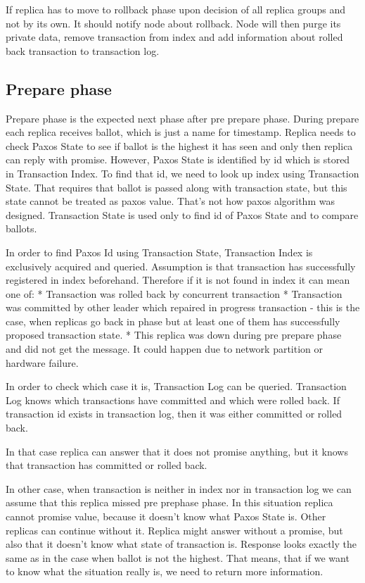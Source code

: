 If replica has to move to rollback phase upon decision of all replica groups and not by its own. It should notify node about rollback. Node will then purge its private data, remove transaction from index and add information about rolled back transaction to transaction log.


\subsection{Prepare phase}
Prepare phase is the expected next phase after pre prepare phase. During prepare each replica receives ballot, which is just a name for timestamp. Replica needs to check Paxos State to see if ballot is the highest it has seen and only then replica can reply with promise. However, Paxos State is identified by id which is stored in Transaction Index. To find that id, we need to look up index using Transaction State. That requires that ballot is passed along with transaction state, but this state cannot be treated as paxos value. That’s not how paxos algorithm was designed. Transaction State is used only to find id of Paxos State and to compare ballots.


In order to find Paxos Id using Transaction State, Transaction Index is exclusively acquired and queried. Assumption is that transaction has successfully registered in index beforehand. Therefore if it is not found in index it can mean one of:
* Transaction was rolled back by concurrent transaction
* Transaction was committed by other leader which repaired in progress transaction - this is the case, when replicas go back in phase but at least one of them has successfully proposed transaction state.
* This replica was down during pre prepare phase and did not get the message. It could happen due to network partition or hardware failure.


In order to check which case it is, Transaction Log can be queried. Transaction Log knows which transactions have committed and which were rolled back. If transaction id exists in transaction log, then it was either committed or rolled back.


In that case replica can answer that it does not promise anything, but it knows that transaction has committed or rolled back.


In other case, when transaction is neither in index nor in transaction log we can assume that this replica missed pre prephase phase. In this situation replica cannot promise value, because it doesn’t know what Paxos State is. Other replicas can continue without it. Replica might answer without a promise, but also that it doesn’t know what state of transaction is. Response looks exactly the same as in the case when ballot is not the highest. That means, that if we want to know what the situation really is, we need to return more information.



